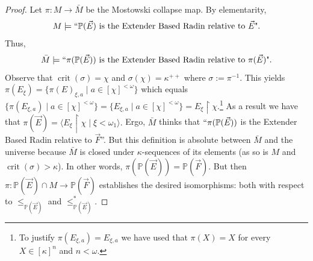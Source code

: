 \documentclass[11pt]{amsart}
\theoremstyle{definition}
\theoremstyle{remark}
\DeclareMathOperator{\crit}{crit}
\DeclareMathOperator{\dom}{dom}
\DeclareMathOperator{\mc}{mc}
\def\s{\subseteq}
\newcommand\ale[1]{\marginpar{Alejandro: #1}}
\begin{document}
 \begin{proof}
Let $\pi\colon M\to \bar{M}$ be the Mostowski collapse map. By elementarity, $$\text{$M\models ``\mathbb{P}(\vec{E})$ is the Extender Based Radin relative to $\vec{E}$".}$$ Thus, 
$$\bar{M}\models \text{$``\pi(\mathbb{P}(\vec{E}))$ is the Extender Based Radin relative to $\pi(\vec{E})$"}.$$
Observe that $\crit(\sigma)=\chi$ and $\sigma(\chi)=\kappa^{++}$ where $\sigma:=\pi^{-1}$.  This yields $\pi(E_\xi)=\{\pi(E)_{\xi,a}\mid a\in [\chi]^{<\omega}\}$ which equals $\{\pi(E_{\xi,a})\mid a\in [\chi]^{<\omega}\}=\{E_{\xi,a}\mid a\in [\chi]^{<\omega}\}=E_\xi\restriction \chi$.\footnote{To justify $\pi(E_{\xi,a})=E_{\xi,a}$  we have used that $\pi(X)=X$ for every $X\in [\kappa]^n$ and $n<\omega$.} As a result we have that $\pi(\vec{E})=\langle E_\xi\restriction \chi\mid \xi<\omega_1\rangle.$ Ergo, $\bar{M}$ thinks that  $``\pi(\mathbb{P}(\vec{E}))$ is the Extender Based Radin relative to $\vec{F}$''. But this definition is absolute between $\bar{M}$ and the universe because $\bar{M}$ is closed under $\kappa$-sequences of its elements (as so is $M$ and $\crit(\sigma)>\kappa$). In other words, $\pi(\mathbb{P}(\vec{E}))=\mathbb{P}(\vec{F})$. But then $\pi\colon \mathbb{P}(\vec{E})\cap M \to \mathbb{P}(\vec{F})$ establishes the desired isomorphisms: both with respect to $\leq_{\mathbb{P}(\vec{E})}$ and $\leq^*_{\mathbb{P}(\vec{E})}$.

 \end{proof}
\end{document}
